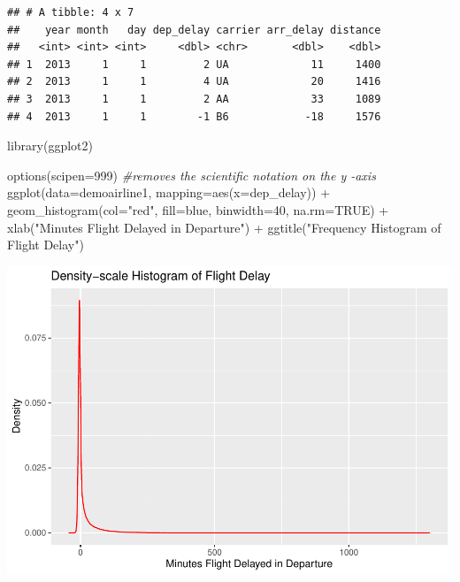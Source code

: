 \documentclass[
]{article}
\newenvironment{Shaded}{\begin{snugshade}}{\end{snugshade}}
\newcommand{\AttributeTok}[1]{\textcolor[rgb]{0.77,0.63,0.00}{#1}}
\newcommand{\CommentTok}[1]{\textcolor[rgb]{0.56,0.35,0.01}{\textit{#1}}}
\newcommand{\ConstantTok}[1]{\textcolor[rgb]{0.00,0.00,0.00}{#1}}
\newcommand{\DecValTok}[1]{\textcolor[rgb]{0.00,0.00,0.81}{#1}}
\newcommand{\FunctionTok}[1]{\textcolor[rgb]{0.00,0.00,0.00}{#1}}
\newcommand{\NormalTok}[1]{#1}
\newcommand{\SpecialCharTok}[1]{\textcolor[rgb]{0.00,0.00,0.00}{#1}}
\newcommand{\StringTok}[1]{\textcolor[rgb]{0.31,0.60,0.02}{#1}}
\begin{document}
\begin{verbatim}
## # A tibble: 4 x 7
##    year month   day dep_delay carrier arr_delay distance
##   <int> <int> <int>     <dbl> <chr>       <dbl>    <dbl>
## 1  2013     1     1         2 UA             11     1400
## 2  2013     1     1         4 UA             20     1416
## 3  2013     1     1         2 AA             33     1089
## 4  2013     1     1        -1 B6            -18     1576
\end{verbatim}

\begin{Shaded}
\begin{Highlighting}[]
\FunctionTok{library}\NormalTok{(ggplot2)}

\FunctionTok{options}\NormalTok{(}\AttributeTok{scipen=}\DecValTok{999}\NormalTok{) }\CommentTok{\#removes the scientific notation on the y {-}axis}
\FunctionTok{ggplot}\NormalTok{(}\AttributeTok{data=}\NormalTok{demoairline1, }\AttributeTok{mapping=}\FunctionTok{aes}\NormalTok{(}\AttributeTok{x=}\NormalTok{dep\_delay)) }\SpecialCharTok{+} \FunctionTok{geom\_histogram}\NormalTok{(}\AttributeTok{col=}\StringTok{"red"}\NormalTok{, }\AttributeTok{fill=}\StringTok{\textquotesingle{}blue\textquotesingle{}}\NormalTok{, }\AttributeTok{binwidth=}\DecValTok{40}\NormalTok{, }\AttributeTok{na.rm=}\ConstantTok{TRUE}\NormalTok{) }\SpecialCharTok{+} \FunctionTok{xlab}\NormalTok{(}\StringTok{"Minutes Flight Delayed in Departure"}\NormalTok{) }\SpecialCharTok{+} \FunctionTok{ggtitle}\NormalTok{(}\StringTok{"Frequency Histogram of Flight Delay"}\NormalTok{)}
\end{Highlighting}
\end{Shaded}

\includegraphics{DataVisua2_files/figure-latex/unnamed-chunk-6-1.pdf}
\end{document}
